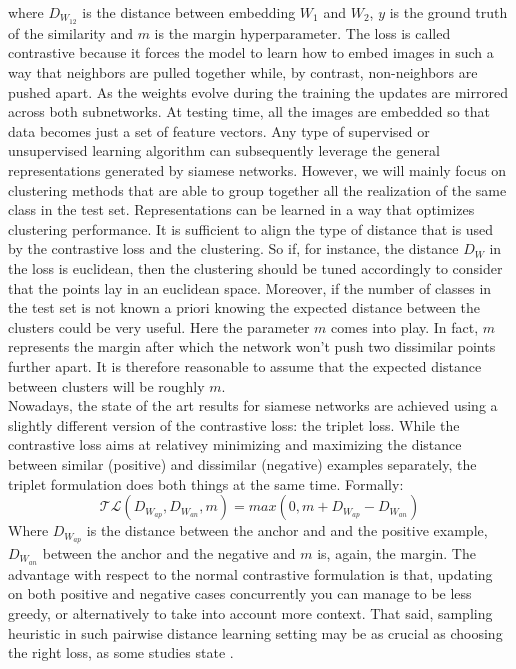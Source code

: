where $D_{W_{12}}$ is the distance between embedding $W_1$ and $W_2$, $y$ is the ground truth of the similarity and $m$ is the margin hyperparameter. The loss is called contrastive because it forces the model to learn how to embed images in such a way that neighbors are pulled together while, by contrast, non-neighbors are pushed apart. As the weights evolve during the training the updates are mirrored across both subnetworks. At testing time, all the images are embedded so that data becomes just a set of feature vectors. Any type of supervised or unsupervised learning algorithm can subsequently leverage the general representations generated by siamese networks. However, we will mainly focus on clustering methods that are able to group together all the realization of the same class in the test set. Representations can be learned in a way that optimizes clustering performance. It is sufficient to align the type of distance that is used by the contrastive loss and the clustering. So if, for instance, the distance $D_W$ in the loss is euclidean, then the clustering should be tuned accordingly to consider that the points lay in an euclidean space. Moreover, if the number of classes in the test set is not known a priori knowing the expected distance between the clusters could be very useful. Here the parameter $m$ comes into play. In fact, $m$ represents the margin after which the network won't push two dissimilar points further apart. It is therefore reasonable to assume that the expected distance between clusters will be roughly $m$.\\
Nowadays, the state of the art results for siamese networks are achieved using a slightly different version of the contrastive loss: the triplet loss. While the contrastive loss aims at relativey minimizing and maximizing the distance between similar (positive) and dissimilar (negative) examples separately, the triplet formulation does both things at the same time. Formally:
\begin{equation}
  \mathcal{TL}(D_{W_{ap}},D_{W_{an}}, m) = max(0,m+D_{W_{ap}}-D_{W_{an}})
\end{equation}
Where $D_{W_{ap}}$ is the distance between the anchor and and the positive example, $D_{W_{an}}$ between the anchor and the negative and $m$ is, again, the margin. The advantage with respect to the normal contrastive formulation is that, updating on both positive and negative cases concurrently you can manage to be less greedy, or alternatively to take into account more context. That said, sampling heuristic in such pairwise distance learning setting may be as crucial as choosing the right loss, as some studies state \cite{wu2017sampling}.

